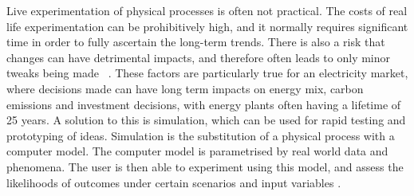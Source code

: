 Live experimentation of physical processes is often not practical. The costs of real life experimentation can be prohibitively high, and it normally requires significant time in order to fully ascertain the long-term trends. There is also a risk that changes can have detrimental impacts, and therefore often leads to only minor tweaks being made ~\cite{Forshaw2016}. These factors are particularly true for an electricity market, where decisions made can have long term impacts on energy mix, carbon emissions and investment decisions, with energy plants often having a lifetime of 25 years.  A solution to this is simulation, which can be used for rapid testing and prototyping of ideas. Simulation is the substitution of a physical process with a computer model. The computer model is parametrised by real world data and phenomena. The user is then able to experiment using this model, and assess the likelihoods of outcomes under certain scenarios and input variables \cite{Law:603360}.


